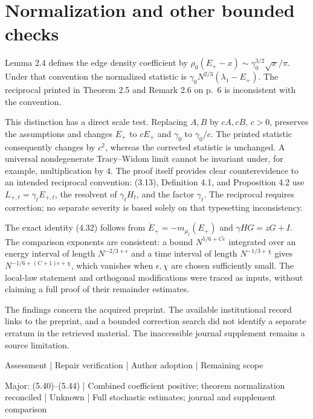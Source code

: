 \documentclass[10pt]{article}
\begin{document}
\section*{Normalization and other bounded checks}
Lemma 2.4 defines the edge density coefficient by \(\rho_0(E_+-x)\sim\gamma_0^{3/2}\sqrt{x}/\pi\). Under that convention the normalized statistic is \(\gamma_0N^{2/3}(\lambda_1-E_+)\). The reciprocal printed in Theorem 2.5 and Remark 2.6 on p. 6 is inconsistent with the convention.\par
This distinction has a direct scale test. Replacing \(A,B\) by \(cA,cB\), \(c>0\), preserves the assumptions and changes \(E_+\) to \(cE_+\) and \(\gamma_0\) to \(\gamma_0/c\). The printed statistic consequently changes by \(c^2\), whereas the corrected statistic is unchanged. A universal nondegenerate Tracy–Widom limit cannot be invariant under, for example, multiplication by \(4\). The proof itself provides clear counterevidence to an intended reciprocal convention: (3.13), Definition 4.1, and Proposition 4.2 use \(L_{+,t}=\gamma_tE_{+,t}\), the resolvent of \(\gamma_tH_t\), and the factor \(\gamma_t\). The reciprocal requires correction; no separate severity is based solely on that typesetting inconsistency.\par
The exact identity (4.32) follows from \(\dot E_+=-m_{\mu_t}(E_+)\) and \(\gamma HG=zG+I\). The comparison exponents are consistent: a bound \(N^{5/6+C\epsilon}\) integrated over an energy interval of length \(N^{-2/3+\epsilon}\) and a time interval of length \(N^{-1/3+\chi}\) gives \(N^{-1/6+(C+1)\epsilon+\chi}\), which vanishes when \(\epsilon,\chi\) are chosen sufficiently small. The local-law statement and orthogonal modifications were traced as inputs, without claiming a full proof of their remainder estimates.\par
The findings concern the acquired preprint. The available institutional record links to the preprint, and a bounded correction search did not identify a separate erratum in the retrieved material. The inaccessible journal supplement remains a source limitation.\par
Assessment | Repair verification | Author adoption | Remaining scope\par
Major: (5.40)–(5.44) | Combined coefficient positive; theorem normalization reconciled | Unknown | Full stochastic estimates; journal and supplement comparison\par
\end{document}
